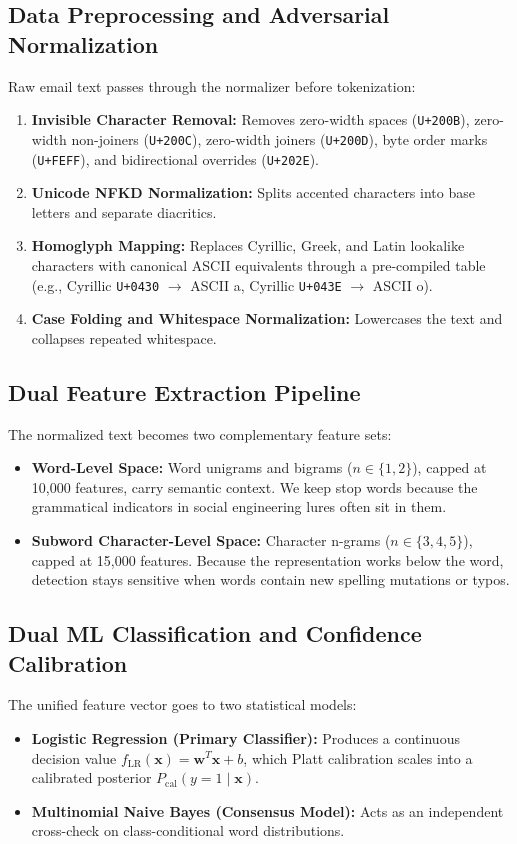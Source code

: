 \documentclass[conference]{IEEEtran}
\begin{document}
\subsection{Data Preprocessing and Adversarial Normalization}
Raw email text passes through the normalizer before tokenization:
\begin{enumerate}
    \item \textbf{Invisible Character Removal:} Removes zero-width spaces (\texttt{U+200B}), zero-width non-joiners (\texttt{U+200C}), zero-width joiners (\texttt{U+200D}), byte order marks (\texttt{U+FEFF}), and bidirectional overrides (\texttt{U+202E}).
    \item \textbf{Unicode NFKD Normalization:} Splits accented characters into base letters and separate diacritics.
    \item \textbf{Homoglyph Mapping:} Replaces Cyrillic, Greek, and Latin lookalike characters with canonical ASCII equivalents through a pre-compiled table (e.g., Cyrillic \texttt{U+0430} $\rightarrow$ ASCII a, Cyrillic \texttt{U+043E} $\rightarrow$ ASCII o).
    \item \textbf{Case Folding and Whitespace Normalization:} Lowercases the text and collapses repeated whitespace.
\end{enumerate}

\subsection{Dual Feature Extraction Pipeline}
The normalized text becomes two complementary feature sets:
\begin{itemize}
    \item \textbf{Word-Level Space:} Word unigrams and bigrams ($n \in \{1,2\}$), capped at 10,000 features, carry semantic context. We keep stop words because the grammatical indicators in social engineering lures often sit in them.
    \item \textbf{Subword Character-Level Space:} Character n-grams ($n \in \{3,4,5\}$), capped at 15,000 features. Because the representation works below the word, detection stays sensitive when words contain new spelling mutations or typos.
\end{itemize}

\subsection{Dual ML Classification and Confidence Calibration}
The unified feature vector goes to two statistical models:
\begin{itemize}
    \item \textbf{Logistic Regression (Primary Classifier):} Produces a continuous decision value $f_{\text{LR}}(\mathbf{x}) = \mathbf{w}^T \mathbf{x} + b$, which Platt calibration scales into a calibrated posterior $P_{\text{cal}}(y=1 \mid \mathbf{x})$.
    \item \textbf{Multinomial Naive Bayes (Consensus Model):} Acts as an independent cross-check on class-conditional word distributions.
\end{itemize}
\end{document}
